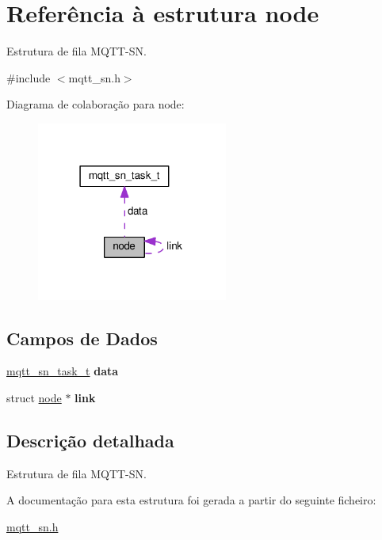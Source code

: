 \hypertarget{structnode}{\section{Referência à estrutura node}
\label{structnode}
}


Estrutura de fila M\+Q\+T\+T-\/\+S\+N.  




{\ttfamily \#include $<$mqtt\+\_\+sn.\+h$>$}



Diagrama de colaboração para node\+:\nopagebreak
\begin{figure}[H]
\begin{center}
\leavevmode
\includegraphics[width=178pt]{structnode__coll__graph}
\end{center}
\end{figure}
\subsection*{Campos de Dados}
\begin{DoxyCompactItemize}
\item 
\hypertarget{structnode_a2a4aa9e422389a8d7a97309a99143ce2}{\hyperlink{structmqtt__sn__task__t}{mqtt\+\_\+sn\+\_\+task\+\_\+t} {\bfseries data}}\label{structnode_a2a4aa9e422389a8d7a97309a99143ce2}

\item 
\hypertarget{structnode_ae20eb3a9a05750fd84dd04b48a8940c3}{struct \hyperlink{structnode}{node} $\ast$ {\bfseries link}}\label{structnode_ae20eb3a9a05750fd84dd04b48a8940c3}

\end{DoxyCompactItemize}


\subsection{Descrição detalhada}
Estrutura de fila M\+Q\+T\+T-\/\+S\+N. 

A documentação para esta estrutura foi gerada a partir do seguinte ficheiro\+:\begin{DoxyCompactItemize}
\item 
\hyperlink{mqtt__sn_8h}{mqtt\+\_\+sn.\+h}\end{DoxyCompactItemize}
